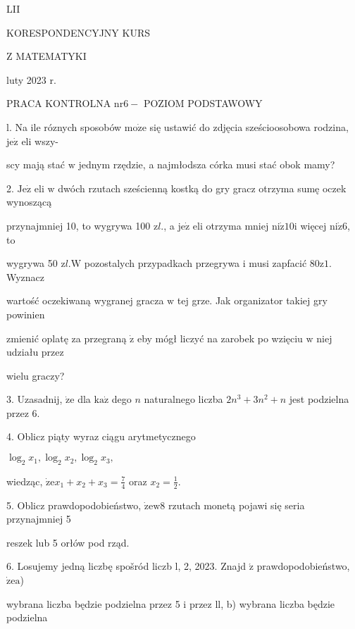 \documentclass[a4paper,12pt]{article}
\begin{document}
LII

KORESPONDENCYJNY KURS

Z MATEMATYKI

luty 2023 r.

PRACA KONTROLNA $\mathrm{n}\mathrm{r} 6-$ POZIOM PODSTAWOWY

l. Na ile róznych sposobów $\mathrm{m}\mathrm{o}\dot{\mathrm{z}}\mathrm{e}$ się ustawić do zdjęcia sześcioosobowa rodzina, $\mathrm{j}\mathrm{e}\dot{\mathrm{z}}$ eli wszy-

scy mają stać $\mathrm{w}$ jednym rzędzie, a najmłodsza córka musi stać obok mamy?

2. $\mathrm{J}\mathrm{e}\dot{\mathrm{z}}$ eli $\mathrm{w}$ dwóch rzutach sześcienną kostką do gry gracz otrzyma sumę oczek wynoszącą

przynajmniej 10, to wygrywa 100 $\mathrm{z}l.$, a $\mathrm{j}\mathrm{e}\dot{\mathrm{z}}$ eli otrzyma mniej $\mathrm{n}\mathrm{i}\dot{\mathrm{z}} 10\mathrm{i}$ więcej $\mathrm{n}\mathrm{i}\dot{\mathrm{z}}6$, to

wygrywa 50 $\mathrm{z}l. \mathrm{W}$ pozostalych przypadkach przegrywa $\mathrm{i}$ musi zapfacić $80\mathrm{z}1$. Wyznacz

wartość oczekiwaną wygranej gracza $\mathrm{w}$ tej grze. Jak organizator takiej gry powinien

zmienić oplatę za przegraną $\dot{\mathrm{z}}$ eby mógł liczyć na zarobek po wzięciu $\mathrm{w}$ niej udziału przez

wielu graczy?

3. Uzasadnij, $\dot{\mathrm{z}}\mathrm{e}$ dla $\mathrm{k}\mathrm{a}\dot{\mathrm{z}}$ dego $n$ naturalnego liczba $2n^{3}+3n^{2}+n$ jest podzielna przez 6.

4. Oblicz piąty wyraz ciągu arytmetycznego

$\log_{2}x_{1},\log_{2}x_{2},\log_{2}x_{3},$

wiedząc, $\displaystyle \dot{\mathrm{z}}\mathrm{e}x_{1}+x_{2}+x_{3}=\frac{7}{4}$ oraz $x_{2}=\displaystyle \frac{1}{2}.$

5. Oblicz prawdopodobieństwo, $\dot{\mathrm{z}}\mathrm{e}\mathrm{w} 8$ rzutach monetą pojawi się seria przynajmniej 5

reszek lub 5 orłów pod rząd.

6. Losujemy jedną liczbę spošród liczb l, 2, 2023. Znajd $\acute{\mathrm{z}}$ prawdopodobieństwo, $\dot{\mathrm{z}}\mathrm{e} \mathrm{a}$)

wybrana liczba będzie podzielna przez 5 $\mathrm{i}$ przez ll, b) wybrana liczba będzie podzielna
\end{document}
